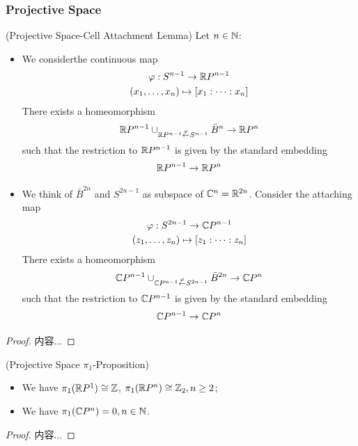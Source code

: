 \documentclass[Total.tex]{subfiles}
\begin{document}
	\subsubsection{Projective Space}
	\begin{lemma}
		(Projective Space-Cell Attachment Lemma) Let $n\in \mathbb{N}$:
		\begin{itemize}
			\item We considerthe continuous map
			\begin{gather*}
				\varphi:S^{n-1}\rightarrow \mathbb{R} P^{n-1}\\
				(x_1,\dots,x_n)\mapsto [x_1:\dots:x_n]
			\end{gather*}
			There exists a homeomorphism
			\begin{gather*}
				\mathbb{R} P^{n-1}\cup_{\mathbb{R} P^{n-1}\stackrel{\varphi}{\leftarrow} S^{n-1}} \bar{B}^n\rightarrow \mathbb{R} P^n  
			\end{gather*}
			such that the restriction to $\mathbb{R} P^{n-1}$ is given by the standard embedding
			\begin{gather*}
				\mathbb{R} P^{n-1}\rightarrow \mathbb{R} P^n
			\end{gather*}
			\item We think of $\bar{B}^{2n}$ and $S^{2n-1}$ as subspace of $\mathbb{C}^n=\mathbb{R}^{2n}$. Consider the attaching map
			\begin{gather*}
				\varphi:S^{2n-1}\rightarrow \mathbb{C} P^{n-1}\\
				(z_1,\dots,z_n)\mapsto [z_1:\dots:z_n]
			\end{gather*}
			There exists a homeomorphism
			\begin{gather*}
				\mathbb{C} P^{n-1}\cup_{\mathbb{C} P^{n-1}\stackrel{\varphi}{\leftarrow} S^{2n-1}} \bar{B}^{2n}\rightarrow \mathbb{C} P^n  
			\end{gather*}
			such that the restriction to $\mathbb{C} P^{n-1}$ is given by the standard embedding
			\begin{gather*}
				\mathbb{C} P^{n-1}\rightarrow \mathbb{C} P^n
			\end{gather*}
		\end{itemize}
	\end{lemma}
	\begin{proof}
		内容...
	\end{proof}
	
	\begin{proposition}
		(Projective Space $\pi_1$-Proposition)
		\begin{itemize}
			\item We have $\pi_1(\mathbb{R} P^1)\cong \mathbb{Z}$, $\pi_1(\mathbb{R} P^n)\cong \mathbb{Z}_2,n\geq  2$;
			\item We have $\pi_1(\mathbb{C} P^n)=0,n\in \mathbb{N}$.
		\end{itemize}
	\end{proposition}
	\begin{proof}
		内容...
	\end{proof}
\end{document}
